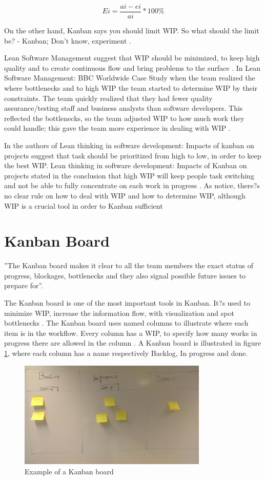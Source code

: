 \documentclass[UKenglish]{ifimaster}  %
\begin{document}
\begin{equation} \label{WIPEQ}
Ei=\frac{ai-ei}{ai}*100\%
\end{equation}

On the other hand, Kanban says you should limit WIP. So what should the limit be? - Kanban; Don't know, experiment \parencite{Kniberg}.

Lean Software Management suggest that WIP should be minimized, to keep high quality \parencite{Ikonen} and to create continuous flow and bring problems to the surface \parencite{Joyce}. In Lean Software Management: BBC Worldwide Case Study when the team realized the where bottlenecks and to high WIP the team started to determine WIP by their constraints. The team quickly realized that they had fewer quality assurance/testing staff and business analysts than software developers. This reflected the bottlenecks, so the team adjusted WIP to how much work they could handle; this gave the team more experience in dealing with WIP \parencite{Joyce}.

In the authors of Lean thinking in software development: Impacts of kanban on projects suggest that task should be prioritized from high to low, in order to keep the best WIP. Lean thinking in software development: Impacts of Kanban on projects stated in the conclusion that high WIP will keep people task switching and not be able to fully concentrate on each work in progress \parencite{Ikonen}.
As notice, there?s no clear rule on how to deal with WIP and how to determine WIP, although WIP is a crucial tool in order to Kanban sufficient

\section {Kanban Board}
''The Kanban board makes it clear to all the team members the exact status of progress, blockages, bottlenecks and they also signal possible future issues to prepare for''\parencite{Joyce}.

The Kanban board is one of the most important tools in Kanban. It?s used to minimize WIP, increase the information flow, with visualization  and spot bottlenecks \parencite{SMR:SMR1599}.
The Kanban board uses named columns to illustrate where each item is in the workflow.  Every column has a WIP, to specify how many works in progress there are allowed in the column \parencite{Joyce}.
A Kanban board is illustrated in figure \ref{kanban_board}, where each column has a name respectively Backlog, In progress and done.
\begin{figure}[ht!]
\centering
\includegraphics[width=90mm]{Picture/kanban_board.jpg}
\caption{Example of a Kanban board}
\label{kanban_board}
\end{figure}
\end{document}
